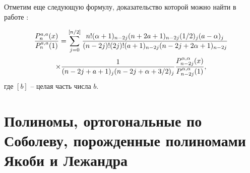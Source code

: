 Отметим еще следующую формулу, доказательство которой можно найти в работе \cite{Gasper}:


$$
{P_n^{a,a}(x)\over P_n^{a,a}(1)}=\sum_{j=0}^{[n/2]}
   { n!(\alpha+1)_{n-2j}(n+2a+1)_{n-2j}(1/2)_j(a-\alpha)_j
    \over (n-2j)!(2j)!(a+1)_{n-2j}(n-2j+2\alpha+1)_{n-2j}}
     $$
\begin{equation}\label{2.15}
    \times{1\over (n-2j+a+1)_j(n-2j+\alpha+3/2)_j}
     {P_{n-2j}^{\alpha,\alpha}(x)\over
P_{n-2j}^{\alpha,\alpha}(1)},
\end{equation}
где $[b]$ -- целая часть числа $b$.





\section{Полиномы, ортогональные по Соболеву, порожденные полиномами Якоби и Лежандра}

